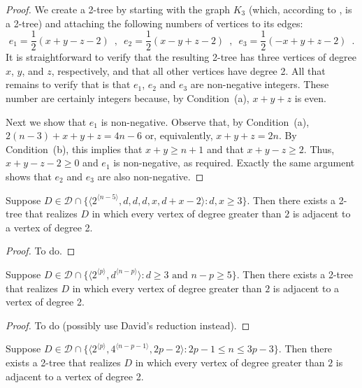 \documentclass[lotsofwhite,charterfonts]{patmorin}
\newcommand{\rep}[1]{^{\langle#1\rangle}}
\newcommand{\degreesum}{Condition~(a)}
\newcommand{\maxdegree}{Condition~(b)}
\begin{document}
\begin{proof}
We create a 2-tree by starting with the graph $K_3$ (which, according
to , is a
2-tree) and attaching the following numbers of vertices to its edges:
\[
    e_1=\frac{1}{2}(x+y-z-2) \enspace , \enspace
    e_2=\frac{1}{2}(x-y+z-2) \enspace , \enspace 
    e_3=\frac{1}{2}(-x+y+z-2) \enspace .
\]
It is straightforward to verify that the resulting 2-tree has three
vertices of degree $x$, $y$, and $z$, respectively, and that all other
vertices have degree 2.  All that remains to verify that is that
$e_1$, $e_2$ and $e_3$ are non-negative integers.  These number are
certainly integers because, by \degreesum, $x+y+z$ is even.  

Next we show that $e_1$ is non-negative.  Observe that, by \degreesum,
$2(n-3)+x+y+z = 4n-6$ or, equivalently, $x+y+z=2n$.  By \maxdegree,
this implies that $x+y \ge n+1$ and that $x+y-z \ge 2$.  Thus,
$x+y-z-2 \ge 0$ and $e_1$ is non-negative, as required.  
Exactly the same argument shows that $e_2$ and $e_3$ are also
non-negative.
\end{proof}

\begin{lem}
Suppose $D\in \mathcal{D}\cap \{\langle 2\rep{n-5},d,d,d,x,d+x-2 \rangle:
\mbox{$d,x\ge 3$}\}$.
Then there exists a 2-tree that realizes $D$ in which every vertex of
degree greater than $2$ is adjacent to a vertex of degree 2.
\end{lem}

\begin{proof}
To do.
\end{proof}


\begin{lem}
Suppose $D\in \mathcal{D}\cap \{\langle 2\rep{p},d\rep{n-p}\rangle:
\mbox{$d\ge 3$ and $n-p \ge 5$}\}$.
Then there exists a 2-tree that realizes $D$ in which every vertex of
degree greater than $2$ is adjacent to a vertex of degree 2.
\end{lem}

\begin{proof}
To do (possibly use David's reduction instead).
\end{proof}


\begin{lem}
Suppose $D\in \mathcal{D}\cap \{\langle 2\rep{p},4\rep{n-p-1},2p-2\rangle:
2p-1\le n\le 3p-3\}$.
Then there exists a 2-tree that realizes $D$ in which every vertex of
degree greater than $2$ is adjacent to a vertex of degree 2.
\end{lem}
\end{document}
